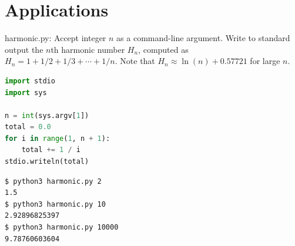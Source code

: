 \documentclass[8pt,a4paper,compress]{beamer}
\begin{document}
\section{Applications}
\begin{frame}[fragile]
\pause

\begin{framed}
\tiny harmonic.py: Accept integer $n$ as a command-line argument. Write to standard output the $n$th harmonic number $H_n$, computed as $H_n=1+1/2+1/3+\cdots+1/n$. Note that $H_n \approx \ln(n) + 0.57721$ for large $n$.
\end{framed}

\begin{lstlisting}[language=Python]
import stdio
import sys

n = int(sys.argv[1])
total = 0.0
for i in range(1, n + 1):
    total += 1 / i
stdio.writeln(total)
\end{lstlisting}

\pause

\begin{lstlisting}[language={}]
$ python3 harmonic.py 2
1.5
$ python3 harmonic.py 10
2.92896825397
$ python3 harmonic.py 10000
9.78760603604
\end{lstlisting}
\end{frame}
\end{document}
